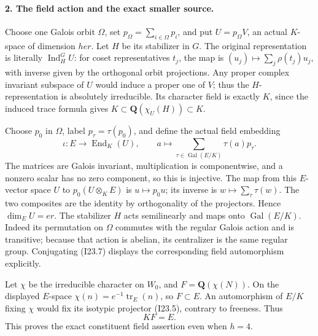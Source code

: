 \paragraph{2. The field action and the exact smaller source.}
Choose one Galois orbit \(\Omega\), set
\(p_\Omega=\sum_{i\in\Omega}p_i\), and put
\(U=p_\Omega V\), an actual \(K\)-space of dimension \(her\).
Let \(H\) be its stabilizer in \(G\). The original representation
is literally \(\operatorname{Ind}_H^G U\): for coset
representatives \(t_j\), the map is
\((u_j)\mapsto\sum_j\rho(t_j)u_j\), with inverse given by
the orthogonal orbit projections. Any proper complex invariant
subspace of \(U\) would induce a proper one of \(V\); thus
the \(H\)-representation is absolutely irreducible.
Its character field is exactly \(K\), since the induced trace
formula gives \(K\subset\mathbf Q(\chi_U(H))\subset K\).

Choose \(p_0\) in \(\Omega\), label
\(p_\tau=\tau(p_0)\), and define the actual field embedding
\[
 \iota:E\longrightarrow\operatorname{End}_K(U),\qquad
                a\longmapsto\sum_{\tau\in\operatorname{Gal}(E/K)}
                                             \tau(a)p_\tau. 
                                                               \tag{I23.7}
\]
The matrices are Galois invariant, multiplication is componentwise,
and a nonzero scalar has no zero component, so this is injective.
The map from this \(E\)-vector space \(U\) to
\(p_0(U\otimes_KE)\) is \(u\mapsto p_0u\); its inverse is
\(w\mapsto\sum_\tau\tau(w)\). The two composites are the
identity by orthogonality of the projectors. Hence \(\dim_EU=er\).
The stabilizer \(H\) acts semilinearly and maps onto
\(\operatorname{Gal}(E/K)\). Indeed its permutation on
\(\Omega\) commutes with the regular Galois action and is
transitive; because that action is abelian, its centralizer is the
same regular group. Conjugating (I23.7) displays the corresponding
field automorphism explicitly.

Let \(\chi\) be the irreducible character on \(W_0\), and
\(F=\mathbf Q(\chi(N))\). On the displayed \(E\)-space
\(\chi(n)=e^{-1}\operatorname{tr}_E(n)\), so \(F\subset E\).
An automorphism of \(E/K\) fixing \(\chi\) would fix its
isotypic projector (I23.5), contrary to freeness. Thus
\[
                                  KF=E.                    \tag{I23.8}
\]
This proves the exact constituent field assertion even when \(h=4\).

